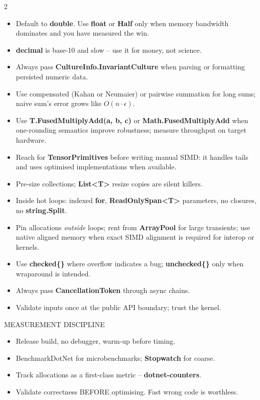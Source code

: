 \documentclass[9pt,a4paper]{extarticle}
\newenvironment{card}[3][acBlue]{%
  \begin{tcolorbox}[
    enhanced, colback=#2, colframe=bdCard,
    coltitle=black, colbacktitle=#2!70!bgHdr,
    fonttitle=\bfseries\fontsize{6.16pt}{7.48pt}\selectfont\MakeUppercase,
    title={#3},
    left=3pt, right=2pt, top=1.4pt, bottom=1.8pt,
    toptitle=1pt, bottomtitle=1pt,
    boxrule=0.4pt,
    borderline west={3pt}{0pt}{#1},
    arc=2pt, before skip=0pt, after skip=1.6mm,
    breakable, toprule at break=0pt, bottomrule at break=0pt,
  ]}{\end{tcolorbox}}
\newcommand{\sub}[1]{%
  \par\vspace{1.5pt}%
  {\fontsize{5.7pt}{7pt}\selectfont\color{gray}\MakeUppercase{#1}}\par
  \vspace{0.5pt}}
\newcommand{\code}[1]{{\ttfamily\bfseries #1}}
\begin{document}
\begin{multicols}{2}
\begin{card}[acAmber]{bgAmber}{Numerical Best Practices}
\begin{itemize}
\item Default to \code{double}. Use \code{float} or \code{Half}
  only when memory bandwidth dominates and you have measured the win.
\item \code{decimal} is base-10 and slow -- use it for money,
  not science.
\item Always pass \code{CultureInfo.InvariantCulture} when parsing or
  formatting persisted numeric data.
\item Use compensated (Kahan or Neumaier) or pairwise summation for
  long sums; naive sum's error grows like $O(n \cdot \epsilon)$.
\item Use \code{T.FusedMultiplyAdd(a, b, c)} or \code{Math.FusedMultiplyAdd}
  when one-rounding semantics improve robustness; measure throughput on target hardware.
\item Reach for \code{TensorPrimitives} before writing manual SIMD: it handles
  tails and uses optimised implementations when available.
\item Pre-size collections; \code{List<T>} resize copies are silent killers.
\item Inside hot loops: indexed \code{for}, \code{ReadOnlySpan<T>}
  parameters, no closures, no \code{string.Split}.
\item Pin allocations \emph{outside} loops; rent from \code{ArrayPool}
  for large transients; use native aligned memory when exact SIMD alignment
  is required for interop or kernels.
\item Use \code{checked\{\}} where overflow indicates a bug;
  \code{unchecked\{\}} only when wraparound is intended.
\item Always pass \code{CancellationToken} through async chains.
\item Validate inputs once at the public API boundary; trust the
  kernel.
\end{itemize}
\sub{Measurement discipline}
\begin{itemize}
\item Release build, no debugger, warm-up before timing.
\item BenchmarkDotNet for microbenchmarks; \code{Stopwatch} for coarse.
\item Track allocations as a first-class metric -- \code{dotnet-counters}.
\item Validate correctness BEFORE optimising. Fast wrong code is worthless.
\end{itemize}
\end{card}


\end{multicols}
\end{document}
